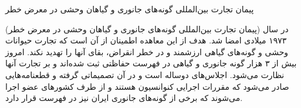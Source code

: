 پیمان تجارت بین‌المللی گونه‌های جانوری و گیاهان وحشی در معرض خطر

 (پیمان تجارت بین‌المللی گونه‌های جانوری و گیاهان وحشی در معرض خطر) در سال ۱۹۷۳ میلادی امضا شد. هدف از این معاهده اطمینان از آن است که تجارت حیوانات وحشی و گونه‌های گیاهی ارزشمند و در خطر انقراض، بقای آنها را تهدید نکند. امروز بیش از ۳ هزار گونه جانوری و گیاهی در فهرست حفاظتی  ثبت شده‌اند و بر تجارت آنها نظارت می‌شود. اجلاس‌های  دوساله است و در آن تصمیماتی گرفته و قطعنامه‌هایی صادر می‌شود که مقررات اجرایی کنوانسیون هستند و از طرف کشورهای عضو اجرا می‌شوند که برخی از گونه‌های جانوری ایران نیز در فهرست  قرار دارد.

